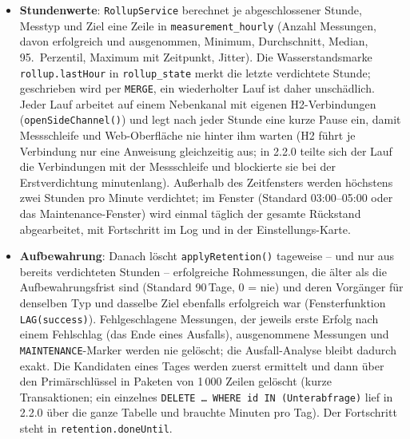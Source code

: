 \begin{itemize}
  \item \textbf{Stundenwerte}: \texttt{RollupService} berechnet je abgeschlossener Stunde,
    Messtyp und Ziel eine Zeile in \texttt{measurement\_hourly} (Anzahl Messungen, davon
    erfolgreich und ausgenommen, Minimum, Durchschnitt, Median, 95.\ Perzentil, Maximum mit
    Zeitpunkt, Jitter). Die Wasserstandsmarke \texttt{rollup.lastHour} in
    \texttt{rollup\_state} merkt die letzte verdichtete Stunde; geschrieben wird per
    \texttt{MERGE}, ein wiederholter Lauf ist daher unschädlich. Jeder Lauf arbeitet auf einem
    Nebenkanal mit eigenen H2-Verbindungen (\texttt{openSideChannel()}) und legt nach jeder
    Stunde eine kurze Pause ein, damit Messschleife und Web-Oberfläche nie hinter ihm warten
    (H2 führt je Verbindung nur eine Anweisung gleichzeitig aus; in 2.2.0 teilte sich der Lauf
    die Verbindungen mit der Messschleife und blockierte sie bei der Erstverdichtung
    minutenlang). Außerhalb des Zeitfensters werden höchstens zwei Stunden pro Minute
    verdichtet; im Fenster (Standard 03:00--05:00 oder das Maintenance-Fenster) wird einmal
    täglich der gesamte Rückstand abgearbeitet, mit Fortschritt im Log und in der
    Einstellungs-Karte.
  \item \textbf{Aufbewahrung}: Danach löscht \texttt{applyRetention()} tageweise -- und nur
    aus bereits verdichteten Stunden -- erfolgreiche Rohmessungen, die älter als die
    Aufbewahrungsfrist sind (Standard 90\,Tage, 0 = nie) und deren Vorgänger für denselben
    Typ und dasselbe Ziel ebenfalls erfolgreich war (Fensterfunktion \texttt{LAG(success)}).
    Fehlgeschlagene Messungen, der jeweils erste Erfolg nach einem Fehlschlag (das Ende eines
    Ausfalls), ausgenommene Messungen und \texttt{MAINTENANCE}-Marker werden nie gelöscht;
    die Ausfall-Analyse bleibt dadurch exakt. Die Kandidaten eines Tages werden zuerst
    ermittelt und dann über den Primärschlüssel in Paketen von 1\,000 Zeilen gelöscht (kurze
    Transaktionen; ein einzelnes \texttt{DELETE \dots\ WHERE id IN (Unterabfrage)} lief in
    2.2.0 über die ganze Tabelle und brauchte Minuten pro Tag). Der Fortschritt steht in
    \texttt{retention.doneUntil}.
\end{itemize}


